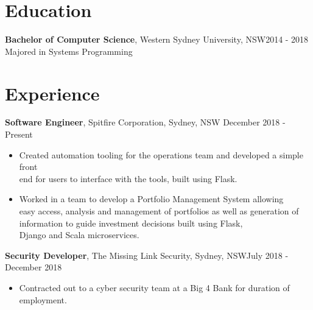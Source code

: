 \documentclass[margin]{res}
\begin{document}

\address{{\bf Present Address} \\ 26/23-25 John Street\\ Lidcombe, NSW 2141}
\address{{\bf Contact Details} \\ ben.hili1994@gmail.com \\ +61414329597}


\begin{resume}

\section{Education}
	{\bf Bachelor of Computer Science}, Western Sydney University, NSW\hfill 2014 - 2018\\ 
	Majored in Systems Programming

\section{Experience}
{\bf Software Engineer}, 
	Spitfire Corporation, Sydney, NSW \hfill December 2018 - Present
\begin{itemize} \itemsep 0pt  %
\item Created automation tooling for the operations team and developed a simple front \\
	end for users to interface with the tools, built using Flask.

\item Worked in a team to develop a Portfolio Management System allowing \\
	easy access, analysis and management of portfolios as well as generation of \\
		information to guide investment decisions built using Flask, \\ 
			Django and Scala microservices.
	
\end{itemize}

{\bf Security Developer}, 
	The Missing Link Security, Sydney, NSW\hfill July 2018 - December 2018
\begin{itemize} \itemsep 0pt  %
\item Contracted out to a cyber security team at a Big 4 Bank for duration of \\
	employment.


\end{itemize}
\end{resume}
\end{document}
